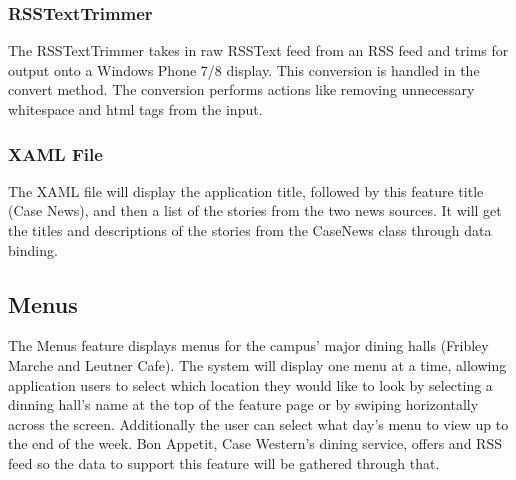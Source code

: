 \documentclass[pdftex,12pt,letter]{article}
\begin{document}
\subsubsection{RSSTextTrimmer}
The RSSTextTrimmer takes in raw RSSText feed from an RSS feed and
trims for output onto a Windows Phone 7/8 display. This conversion is handled in the convert method. The conversion performs actions like removing
unnecessary whitespace and html tags from the input.
\subsubsection{XAML File}
The XAML file will display the application title, followed by this feature title
(Case News), and then a list of the stories from the two news sources. It will
get the titles and descriptions of the stories from the CaseNews class through
data binding.




\subsection{Menus}
The Menus feature displays menus for the campus' major dining halls (Fribley Marche and Leutner Cafe). The system will display one menu at a time, allowing application users to select which location they would like to look by selecting a dinning hall's name at the top of the feature page or by swiping horizontally across the screen. Additionally the user can select what day's menu to view up to the end of the week. Bon Appetit, Case Western's dining service, offers and RSS feed so the data to support this feature will be gathered through that.
\end{document}
